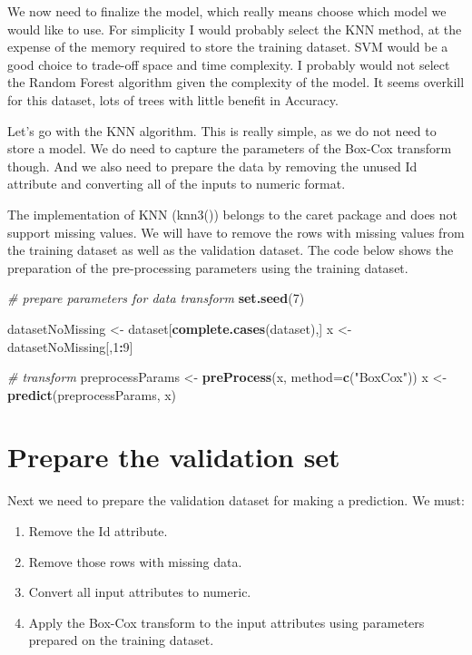 \documentclass[]{book}
\newenvironment{Shaded}{\begin{snugshade}}{\end{snugshade}}
\newcommand{\CommentTok}[1]{\textcolor[rgb]{0.56,0.35,0.01}{\textit{#1}}}
\newcommand{\DataTypeTok}[1]{\textcolor[rgb]{0.13,0.29,0.53}{#1}}
\newcommand{\DecValTok}[1]{\textcolor[rgb]{0.00,0.00,0.81}{#1}}
\newcommand{\KeywordTok}[1]{\textcolor[rgb]{0.13,0.29,0.53}{\textbf{#1}}}
\newcommand{\NormalTok}[1]{#1}
\newcommand{\OperatorTok}[1]{\textcolor[rgb]{0.81,0.36,0.00}{\textbf{#1}}}
\newcommand{\StringTok}[1]{\textcolor[rgb]{0.31,0.60,0.02}{#1}}
\providecommand{\tightlist}{%
  \setlength{\itemsep}{0pt}\setlength{\parskip}{0pt}}
\begin{document}
We now need to ﬁnalize the model, which really means choose which model we would like to use. For simplicity I would probably select the KNN method, at the expense of the memory required to store the training dataset. SVM would be a good choice to trade-oﬀ space and time complexity. I probably would not select the Random Forest algorithm given the complexity of the model. It seems overkill for this dataset, lots of trees with little beneﬁt in Accuracy.

Let's go with the KNN algorithm. This is really simple, as we do not need to store a model. We do need to capture the parameters of the Box-Cox transform though. And we also need to prepare the data by removing the unused Id attribute and converting all of the inputs to numeric format.

The implementation of KNN (knn3()) belongs to the caret package and does not support missing values. We will have to remove the rows with missing values from the training dataset as well as the validation dataset. The code below shows the preparation of the pre-processing parameters using the training dataset.

\begin{Shaded}
\begin{Highlighting}[]
\CommentTok{# prepare parameters for data transform}
\KeywordTok{set.seed}\NormalTok{(}\DecValTok{7}\NormalTok{)}

\NormalTok{datasetNoMissing <-}\StringTok{ }\NormalTok{dataset[}\KeywordTok{complete.cases}\NormalTok{(dataset),]}
\NormalTok{x <-}\StringTok{ }\NormalTok{datasetNoMissing[,}\DecValTok{1}\OperatorTok{:}\DecValTok{9}\NormalTok{]}

\CommentTok{# transform}
\NormalTok{preprocessParams <-}\StringTok{ }\KeywordTok{preProcess}\NormalTok{(x, }\DataTypeTok{method=}\KeywordTok{c}\NormalTok{(}\StringTok{"BoxCox"}\NormalTok{))}
\NormalTok{x <-}\StringTok{ }\KeywordTok{predict}\NormalTok{(preprocessParams, x)}
\end{Highlighting}
\end{Shaded}

\hypertarget{prepare-the-validation-set}{%
\section{Prepare the validation set}\label{prepare-the-validation-set}}

Next we need to prepare the validation dataset for making a prediction. We must:

\begin{enumerate}
\def\labelenumi{\arabic{enumi}.}
\tightlist
\item
  Remove the Id attribute.
\item
  Remove those rows with missing data.
\item
  Convert all input attributes to numeric.
\item
  Apply the Box-Cox transform to the input attributes using parameters prepared on the training dataset.
\end{enumerate}
\end{document}
